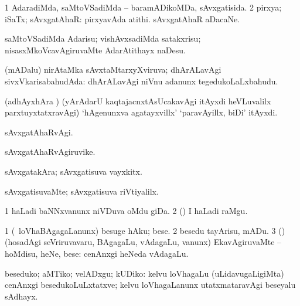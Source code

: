 {{{\bentry
{} 
\gl{\gu}
\bmng
\bnum
\num{1} AdaradiMda, saMtoVSadiMda -- baramADikoMDa, sAvxgatisida. 
\num{2} pirxya; iSaTx; sAvxgatAhaR:  pirxyavAda atithi.  sAvxgatAhaR aDacaNe. 
\enum
\emng

\noindent 
\gl{\pagu}
\expl{}
\bmng
{} saMtoVSadiMda Adarisu; vishAvxsadiMda satakxrisu; nisasxMkoVcavAgiruvaMte AdarAtithayx naDesu. 
\emng
\eentry

\bentry
{} 
\gl{\Agu}
\expl{}
\bmng
(mADalu) nirAtaMka sAvxtaMtarxyXviruva; dhArALavAgi sivxVkarisabahudAda:  dhArALavAgi niVnu adanunx tegedukoLaLxbahudu. 
\emng

\noindent 
\gl{\pagu}
\expl{}
\bmng
{} (adhAyxhAra \parx) (yArAdarU kaqtajacnxtAsUcakavAgi  itAyxdi heVLuvalilx parxtuyxtatxravAgi) `hAgenunxva agatayxvillx' `paravAyillx, biDi' itAyxdi. 
\emng
\eentry

\bentry 
{} 
\gl{\kirxvi}
\expl{}
\bmng
sAvxgatAhaRvAgi. 
\emng
\eentry

\bentry
{} 
\gl{\nA}
\expl{}
\bmng
sAvxgatAhaRvAgiruvike. 
\emng
\eentry

\bentry
{} 
\gl{\nA}
\expl{}
\bmng
sAvxgatakAra; sAvxgatisuva vayxkitx. 
\emng
\eentry

\bentry
{} 
\gl{\kirxvi}
\expl{}
\bmng
sAvxgatisuvaMte; sAvxgatisuva riVtiyalilx. 
\emng
\eentry

\bentry
{} 
\gl{\nA}
\expl{}
\bmng
\bnum
\num{1} haLadi baNNxvanunx niVDuva oMdu giDa. 
\num{2} (\ca) I haLadi raMgu. 
\enum
\emng
\eentry

\bentry
{} 
\gl{\sakirx}
\expl{}
\bmng
\bnum
\num{1} (\kanmu\ loVhaBAgagaLanunx) besuge hAku; bese. 
\num{2} besedu tayArisu, mADu. 
\num{3} (\rUpa) (hosadAgi seVriruvavaru, BAgagaLu, vAdagaLu, \mo vanunx) EkavAgiruvaMte -- hoMdisu, heNe, bese:  cenAnxgi heNeda vAdagaLu. 
\enum
\emng

\noindent 
\gl{\akirx}
\expl{}
\bmng
beseduko; aMTiko; velADxgu; kUDiko:  kelvu loVhagaLu (uLidavugaLigiMta) cenAnxgi besedukoLuLxtatxve; kelvu loVhagaLanunx utatxmataravAgi beseyalu sAdhayx. 
\emng
\eentry

}}}
